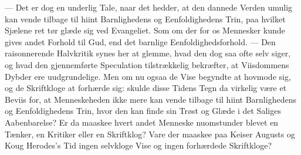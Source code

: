 \documentclass[12pt,a4paper]{book}
\begin{document}
--- Det er dog en underlig Tale, naar det hedder, at den dannede Verden umulig
kan vende tilbage til hiint Barnlighedens og Eenfoldighedens Trin, paa hvilket
Sjælene ret tør glæde sig ved Evangeliet. Som om der for os Mennesker kunde
gives andet Forhold til Gud, end det barnlige Eenfoldighedsforhold. --- Den
raisonnerende Halvkritik synes her at glemme, hvad den dog saa ofte selv siger,
og hvad den gjennemførte Speculation tilstrækkelig
bekræfter, at Viisdommens Dybder ere uudgrundelige. Men om nu ogsaa de Vise
begyndte at hovmode sig, og de Skriftkloge at forhærde sig: skulde disse Tidens
Tegn da virkelig være et Beviis for, at Menneskeheden ikke mere kan vende
tilbage til hiint Barnlighedens og Eenfoldighedens Trin, hvor den kan finde sin
Trøst og Glæde i det Saliges Aabenbarelse? Er da maaskee hvert andet Menneske
nuomstunder blevet en Tænker, en Kritiker eller en Skriftklog? Vare der maaskee
paa Keiser Augusts og Koug
Herodes's Tid ingen selvkloge Vise og ingen forhærdede Skriftkloge?
\end{document}
